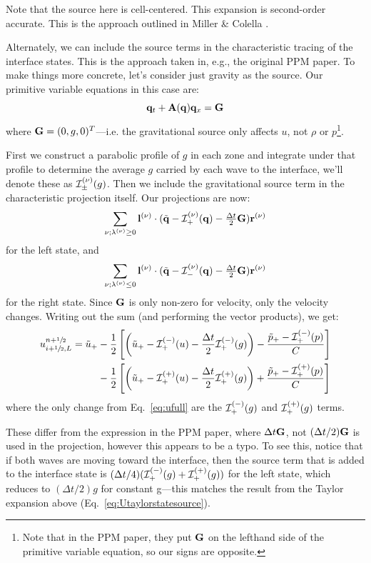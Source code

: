 Note that the source here is cell-centered.  This expansion is
second-order accurate.  This is the approach outlined in Miller
\& Colella \cite{millercolella:2002}.

Alternately, we can include the source terms in the characteristic
tracing of the interface states.  This is the approach taken in, e.g.,
the original PPM paper.  To make things more concrete, let's consider just
gravity as the source.  Our primitive variable equations in this case are:
\begin{equation}
{\bf q}_t + {\bf A}({\bf q}) {\bf q}_x = {\bf G}
\end{equation}
where ${\bf G} = (0, g, 0)^T$---i.e. the gravitational source only affects
$u$, not $\rho$ or $p$\footnote{Note that in the PPM paper, they put ${\bf G}$ on
the lefthand side of the primitive variable equation, so our signs are
opposite.}.

First we construct a parabolic profile of $g$ in each zone and
integrate under that profile to determine the average $g$ carried by
each wave to the interface, we'll denote these as ${\mathcal{I}}^{(\nu)}_\pm(g)$.  Then we include the gravitational source
term in the characteristic projection itself.  Our projections are
now:
\begin{equation}
\sum_{\nu; \lambda^{(\nu)} \ge 0}{\bf l}^{(\nu)} \cdot (\tilde{{\bf q}} - {\mathcal{I}}^{(\nu)}_+({\bf q}) - \tfrac{\Delta t}{2} {\bf G}) {\bf r}^{(\nu)}
\end{equation}
for the left state, and
\begin{equation}
\sum_{\nu; \lambda^{(\nu)} \le 0} {\bf l}^{(\nu)} \cdot (\tilde{{\bf q}} - {\mathcal{I}}^{(\nu)}_-({\bf q}) - \tfrac{\Delta t}{2} {\bf G}) {\bf r}^{(\nu)}
\end{equation}
for the right state.  Since ${\bf G}$ is only non-zero for velocity, only
the velocity changes.  Writing out the sum (and performing the vector products), we
get:
\begin{align}
u_{i+{\sfrac{1}{2}},L}^{n+{\sfrac{1}{2}}} =
   \tilde{u}_+
  &- \frac{1}{2} \left [
      \left (\tilde{u}_+ - {\mathcal{I}}_+^{(-)}(u) - \frac{\Delta t}{2} {\mathcal{I}}^{(-)}_+(g) \right ) -
       \frac{\tilde{p}_+ - {\mathcal{I}}_+^{(-)}(p)}{C} \right ] \nonumber \\
  &- \frac{1}{2} \left [
      \left (\tilde{u}_+ - {\mathcal{I}}_+^{(+)}(u) - \frac{\Delta t}{2} {\mathcal{I}}^{(+)}_+(g) \right ) +
       \frac{\tilde{p}_+ - {\mathcal{I}}_+^{(+)}(p)}{C} \right ]
\end{align}
where the only change from Eq.~\ref{eq:ufull} are the
${\mathcal{I}}^{(-)}_+(g)$ and ${\mathcal{I}}^{(+)}_+(g)$ terms.

These differ from the expression in the PPM paper, where $\Delta t {\bf G}$,
not $(\Delta t/2) {\bf G}$ is used in the projection, however this appears to
be a typo.  To see this, notice that if both waves are moving toward
the interface, then the source term that is added to the interface
state is $(\Delta t/4) ({\mathcal{I}}_+^{(-)}(g) +
{\mathcal{I}}_+^{(+)}(g))$ for the left state, which reduces to $(\Delta
t/2) g$ for constant g---this matches the result from the Taylor
expansion above (Eq.~\ref{eq:Utaylorstatesource}).

